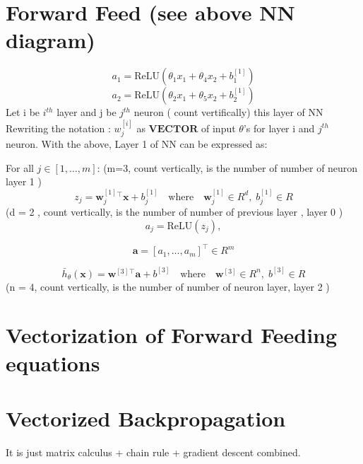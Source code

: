 \documentclass{article}
\begin{document}
\section{Forward Feed (see above NN diagram) }
\[a_1 = \text{ReLU}(\theta_1 x_1 + \theta_4 x_2 + b_{1}^{[1]})\]
\[a_2 = \text{ReLU}(\theta_2 x_1 + \theta_5 x_2 + b_{2}^{[1]})\]
Let i be \(i^{th}\) layer and j be \(j^{th}\) neuron ( count vertifically) this layer of NN \newline 
Rewriting the notation : \(w_{j}^{[i]}\) as \(\textbf{VECTOR}\) of input \(\theta\)'s for layer i and \(j^{th}\) neuron. \newline
With the above, Layer 1 of NN can be expressed as: \newline 

For all \( j \in [1, \dots, m] \): (m=3, count vertically, is the number of number of neuron layer 1 )
\[
z_j = \mathbf{w}^{[1]}_j{}^\top \mathbf{x} + b^{[1]}_j \quad \text{where} \quad \mathbf{w}^{[1]}_j \in R^d, \; b^{[1]}_j \in R
\]
(d = 2 , count vertically, is the number of number of previous layer , layer 0 )
\[
a_j = \text{ReLU}(z_j),
\]

\[
\mathbf{a} = [a_1, \dots, a_m]^\top \in R^m
\]

\[
\bar{h}_\theta(\mathbf{x}) = \mathbf{w}^{[3]}{}^\top \mathbf{a} + b^{[3]} \quad \text{where} \quad \mathbf{w}^{[3]} \in R^n, \; b^{[3]} \in R
\] 
(n = 4, count vertically, is the number of number of neuron  layer, layer 2  )
\section{Vectorization of Forward Feeding equations}
\section{Vectorized Backpropagation}
It is just matrix calculus + chain rule + gradient descent combined.
\end{document}
